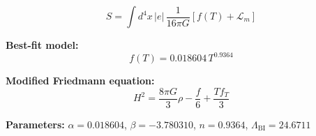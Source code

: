 
\begin{equation}
  S = \int d^4x \, |e| \, \frac{1}{16\pi G} \left[ f(T) + \mathcal{L}_m \right]
\end{equation}

\textbf{Best-fit model:}
\begin{equation}
  f(T) = 0.018604 \, T^{0.9364}
\end{equation}

\textbf{Modified Friedmann equation:}
\begin{equation}
  H^2 = \frac{8\pi G}{3} \rho - \frac{f}{6} + \frac{T f_T}{3}
\end{equation}

\textbf{Parameters:}
$\alpha = 0.018604$, \quad
$\beta = -3.780310$, \quad
$n = 0.9364$, \quad
$\Lambda_{\text{BI}} = 24.6711$